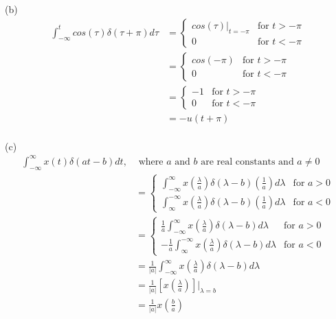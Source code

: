 \documentclass{article}
\begin{document}
(b)
\begin{equation*}
\begin{split}
    \int_{-\infty}^{t} cos(\tau) \delta (\tau + \pi) d\tau
    &= \begin{cases}
        cos(\tau) \big|_{t = -\pi} & \text{for $t > -\pi$}\\
        0 & \text{for $t < -\pi$}
    \end{cases}\\
    &= \begin{cases}
        cos(-\pi) & \text{for $t > -\pi$}\\
        0 & \text{for $t < -\pi$}
    \end{cases}\\
    &= \begin{cases}
        -1 & \text{for $t > -\pi$}\\
        0 & \text{for $t < -\pi$}
    \end{cases}\\
    &= -u(t + \pi)\\
\end{split}
\end{equation*}

(c)
\begin{equation*}
\begin{split}
    \int_{-\infty}^{\infty} x(t) \delta (at-b)dt, & \text{ where $a$ and $b$ are real constants and $a \neq 0$}\\
     &= \begin{cases}
        \int_{-\infty}^{\infty} x (\frac{\lambda}{a}) \delta(\lambda - b)(\frac{1}{a})d\lambda & \text{for $a > 0$}\\
        \int_{\infty}^{-\infty} x (\frac{\lambda}{a}) \delta(\lambda - b)(\frac{1}{a})d\lambda & \text{for $a < 0$}
    \end{cases}\\
     &= \begin{cases}
        \frac{1}{a} \int_{-\infty}^{\infty} x (\frac{\lambda}{a}) \delta(\lambda - b)d\lambda & \text{for $a > 0$}\\
        -\frac{1}{a} \int_{\infty}^{-\infty} x (\frac{\lambda}{a}) \delta(\lambda - b)d\lambda & \text{for $a < 0$}
    \end{cases}\\
    &= \frac{1}{|a|} \int_{-\infty}^{\infty} x (\frac{\lambda}{a}) \delta(\lambda - b)d\lambda\\
    &= \frac{1}{|a|} [x(\frac{\lambda}{a})]\big|_{\lambda = b}\\
    &= \frac{1}{|a|}x (\frac{b}{a})
\end{split}
\end{equation*}
\end{document}
